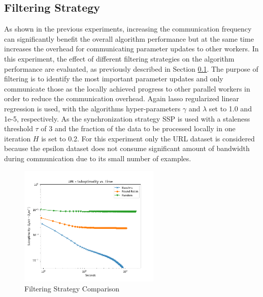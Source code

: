 \subsection{Filtering Strategy}
\label{ss:filtering_strategy}
As shown in the previous experiments, increasing the communication frequency can significantly benefit the overall algorithm performance but at the same time increases the overhead for communicating parameter updates to other workers.
In this experiment, the effect of different filtering strategies on the algorithm performance are evaluated, as previously described in Section \ref{ss:filtering_strategy}.
The purpose of filtering is to identify the most important parameter updates and only communicate those as the locally achieved progress to other parallel workers in order to reduce the communication overhead.
Again lasso regularized linear regression is used, with the algorithms hyper-parameters $\gamma$ and $\lambda$ set to 1.0 and 1e-5, respectively.
As the synchronization strategy SSP is used with a staleness threshold $\tau$ of 3 and the fraction of the data to be processed locally in one iteration $H$ is set to 0.2.
For this experiment only the URL dataset is considered because the epsilon dataset does not consume significant amount of bandwidth during communication due to its small number of examples.
\begin{figure}[ht]
\centering
\includegraphics[width=0.6\textwidth]{img/filter_strat_cmp.png}
\caption{Filtering Strategy Comparison}
\label{fig:filt_strat_cmp}
\end{figure}

